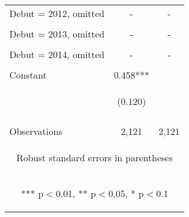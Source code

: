 \begin{center}
\begin{tabular}{lcc}
Debut = 2012, omitted & - & - \\
\vspace{4pt} & \begin{footnotesize}\end{footnotesize} & \begin{footnotesize}\end{footnotesize} \\
Debut = 2013, omitted & - & - \\
\vspace{4pt} & \begin{footnotesize}\end{footnotesize} & \begin{footnotesize}\end{footnotesize} \\
Debut = 2014, omitted & - & - \\
\vspace{4pt} & \begin{footnotesize}\end{footnotesize} & \begin{footnotesize}\end{footnotesize} \\
Constant & 0.458*** &  \\
 & \begin{footnotesize}(0.120)\end{footnotesize} & \begin{footnotesize}\end{footnotesize} \\
\vspace{4pt} & \begin{footnotesize}\end{footnotesize} & \begin{footnotesize}\end{footnotesize} \\
 Observations & 2,121 & 2,121 \\ \hline
\multicolumn{3}{c}{\begin{footnotesize} Robust standard errors in parentheses\end{footnotesize}} \\
\multicolumn{3}{c}{\begin{footnotesize} *** p$<$0.01, ** p$<$0.05, * p$<$0.1\end{footnotesize}} \\
\end{tabular}
\end{center}
